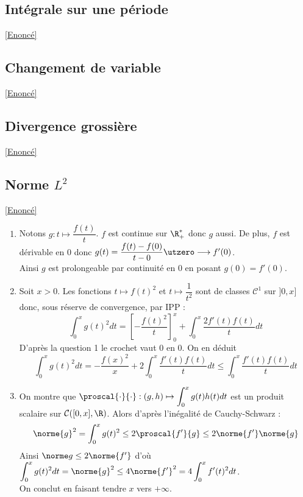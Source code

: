 \documentclass{book}
\begin{document}
	\subsection{Intégrale sur une période}
	\label{Intégrale sur une période corrigé}
	\textcolor{blue}{\hyperref[Intégrale sur une période]{[Enoncé]}}\\
	
	\subsection{Changement de variable}
	\label{Changement de variable corrigé}
	\textcolor{blue}{\hyperref[Changement de variable]{[Enoncé]}}\\
	
	\subsection{Divergence grossière}
	\label{Divergence grossière corrigé}
	\textcolor{blue}{\hyperref[Divergence grossière]{[Enoncé]}}\\
	
	\subsection{Norme $L^2$ }
	\label{Norme L^2 corrigé}
	\textcolor{blue}{\hyperref[Norme L^2]{[Enoncé]}}\\
	\begin{enumerate}[leftmargin=*]
		\item Notons $g:t\mapsto \dfrac{f(t)}{t}$. $f$ est continue sur $\R^*_+$ donc $g$ aussi. De plus, $f$ est dérivable en $0$ donc $g(t)=\dfrac{f(t)-f(0)}{t-0}\utzero\longrightarrow f'(0)$.\\
		Ainsi $g$ est prolongeable par continuité en $0$ en posant $g(0)=f'(0)$.
		\item Soit $x>0$. Les fonctions $t\mapsto f(t)^2$ et $t\mapsto \dfrac{1}{t^2}$ sont de classes $\mathcal C^1$ sur $]0,x]$ donc, sous réserve de convergence, par IPP :
		$$\int_0^xg(t)^2dt=\left[-\frac{f(t)^2}{t}\right]_0^x+\int_0^x\frac{2f'(t)f(t)}{t}dt$$
		D'après la question 1 le crochet vaut $0$ en $0$. On en déduit
		$$\int_0^xg(t)^2dt=-\frac{f(x)^2}{x}+2\int_0^x\frac{f'(t)f(t)}{t}dt\leq \int_0^x\frac{f'(t)f(t)}{t}dt$$
		\item On montre que $\proscal{\cdot}{\cdot}:(g,h)\mapsto \displaystyle\int_0^xg(t)h(t)dt$ est un produit scalaire sur $\mathcal C([0,x],\R)$. Alors d'après l'inégalité de Cauchy-Schwarz :
		$$\norme{g}^2=\int_0^xg(t)^2\leq 2\proscal{f'}{g}\leq 2\norme{f'}\norme{g}$$
		Ainsi $\norme g\leq 2\norme{f'}$ d'où $\displaystyle\int_0^xg(t)^2dt=\norme{g}^2\leq 4\norme{f'}^2=4\int_0^xf'(t)^2dt$.\\
		On conclut en faisant tendre $x$ vers $+\infty$.
	\end{enumerate}
	
\end{document}
